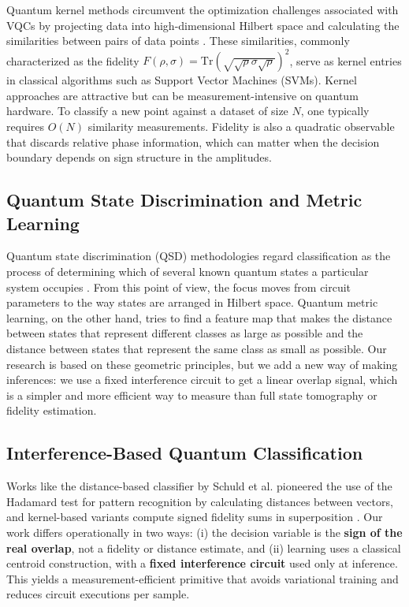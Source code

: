 \documentclass[conference]{IEEEtran}
\begin{document}
Quantum kernel methods circumvent the optimization challenges associated with VQCs by projecting data into high-dimensional Hilbert space and calculating the similarities between pairs of data points \cite{schuld2019feature,havlicek2019supervised}. These similarities, commonly characterized as the fidelity $F(\rho, \sigma) = \text{Tr}(\sqrt{\sqrt{\rho}\sigma\sqrt{\rho}})^2$, serve as kernel entries in classical algorithms such as Support Vector Machines (SVMs). Kernel approaches are attractive but can be measurement-intensive on quantum hardware. To classify a new point against a dataset of size $N$, one typically requires $O(N)$ similarity measurements. Fidelity is also a quadratic observable that discards relative phase information, which can matter when the decision boundary depends on sign structure in the amplitudes.

\subsection{Quantum State Discrimination and Metric Learning}

Quantum state discrimination (QSD) methodologies regard classification as the process of determining which of several known quantum states a particular system occupies \cite{sergioli2019binary,gonzalez2021classification}. From this point of view, the focus moves from circuit parameters to the way states are arranged in Hilbert space. Quantum metric learning, on the other hand, tries to find a feature map that makes the distance between states that represent different classes as large as possible and the distance between states that represent the same class as small as possible. Our research is based on these geometric principles, but we add a new way of making inferences: we use a fixed interference circuit to get a linear overlap signal, which is a simpler and more efficient way to measure than full state tomography or fidelity estimation.

\subsection{Interference-Based Quantum Classification}

Works like the distance-based classifier by Schuld et al. \cite{schuld2017distance,schuld2018book} pioneered the use of the Hadamard test for pattern recognition by calculating distances between vectors, and kernel-based variants compute signed fidelity sums in superposition \cite{blank2020kernel,blank2022compact}. Our work differs operationally in two ways: (i) the decision variable is the \textbf{sign of the real overlap}, not a fidelity or distance estimate, and (ii) learning uses a classical centroid construction, with a \textbf{fixed interference circuit} used only at inference. This yields a measurement-efficient primitive that avoids variational training and reduces circuit executions per sample.
\end{document}
